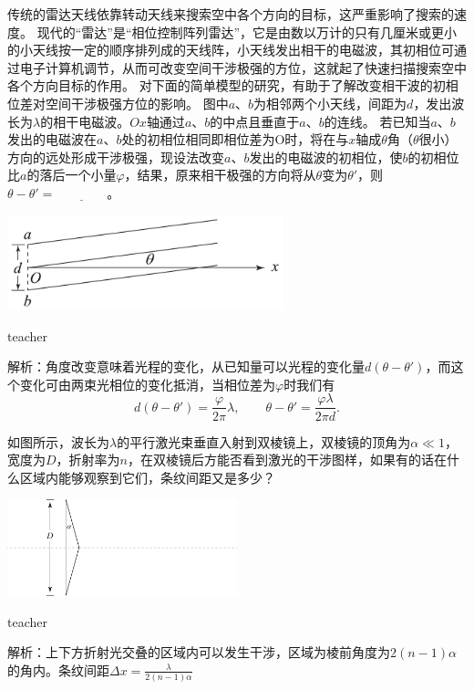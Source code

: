 \begin{example}
传统的雷达天线依靠转动天线来搜索空中各个方向的目标，这严重影响了搜索的速度。
现代的“雷达”是“相位控制阵列雷达”，它是由数以万计的只有几厘米或更小的小天线按一定的顺序排列成的天线阵，小天线发出相干的电磁波，其初相位可通过电子计算机调节，从而可改变空间干涉极强的方位，这就起了快速扫描搜索空中各个方向目标的作用。
对下面的简单模型的研究，有助于了解改变相干波的初相位差对空间干涉极强方位的影响。
图中$a、b$为相邻两个小天线，间距为$d$，发出波长为$\lambda$的相干电磁波。$Ox$轴通过$a$、$b$的中点且垂直于$a$、$b$的连线。
若已知当$a$、$b$发出的电磁波在$a$、$b$处的初相位相同即相位差为O时，将在与$x$轴成$\theta$角（$\theta$很小）方向的远处形成干涉极强，现设法改变$a$、$b$发出的电磁波的初相位，使$b$的初相位比$a$的落后一个小量$\varphi$，结果，原来相干极强的方向将从$\theta$变为$\theta'$，则$\theta-\theta' = \underline{\qquad \qquad }$。
\begin{flushright}
\includegraphics[width = 0.6\textwidth]{images/wave-optics-1.pdf} 
\end{flushright}


\begin{taggedblock}{teacher}

解析：角度改变意味着光程的变化，从已知量可以光程的变化量$d(\theta-\theta')$，而这个变化可由两束光相位的变化抵消，当相位差为$\varphi$时我们有
\[
d(\theta-\theta')=\frac{\varphi}{2\pi}\lambda,\qquad \theta-\theta' = \frac{\varphi \lambda}{2\pi d}.
\]
\end{taggedblock}
\end{example}

\begin{example}
	如图所示，波长为$\lambda$的平行激光束垂直入射到双棱镜上，双棱镜的顶角为$\alpha\ll 1$，宽度为$D$，折射率为$n$，在双棱镜后方能否看到激光的干涉图样，如果有的话在什么区域内能够观察到它们，条纹间距又是多少？
			\begin{flushright}
				\includegraphics[width = 0.5\textwidth]{images/wave-1.pdf}
			\end{flushright}
	\begin{taggedblock}{teacher}
		
		解析：上下方折射光交叠的区域内可以发生干涉，区域为棱前角度为$2(n-1)\alpha$的角内。条纹间距$\Delta x = \frac{\lambda}{2(n-1)\alpha}$
	\end{taggedblock}
\end{example}%

